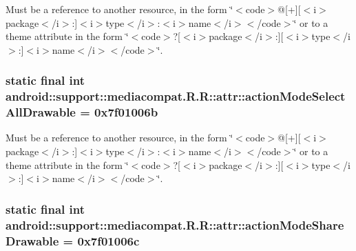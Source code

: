 Must be a reference to another resource, in the form \char`\"{}$<$code$>$@\mbox{[}+\mbox{]}\mbox{[}$<$i$>$package$<$/i$>$:\mbox{]}$<$i$>$type$<$/i$>$:$<$i$>$name$<$/i$>$$<$/code$>$\char`\"{} or to a theme attribute in the form \char`\"{}$<$code$>$?\mbox{[}$<$i$>$package$<$/i$>$:\mbox{]}\mbox{[}$<$i$>$type$<$/i$>$:\mbox{]}$<$i$>$name$<$/i$>$$<$/code$>$\char`\"{}. \hypertarget{classandroid_1_1support_1_1mediacompat_1_1_r_1_1attr_1cad0f0c7594e1af8e920d1537eef02a}{
\subsubsection[{actionModeSelectAllDrawable}]{\setlength{\rightskip}{0pt plus 5cm}static final int android::support::mediacompat.R.R::attr::actionModeSelectAllDrawable = 0x7f01006b}}
\label{classandroid_1_1support_1_1mediacompat_1_1_r_1_1attr_1cad0f0c7594e1af8e920d1537eef02a}


Must be a reference to another resource, in the form \char`\"{}$<$code$>$@\mbox{[}+\mbox{]}\mbox{[}$<$i$>$package$<$/i$>$:\mbox{]}$<$i$>$type$<$/i$>$:$<$i$>$name$<$/i$>$$<$/code$>$\char`\"{} or to a theme attribute in the form \char`\"{}$<$code$>$?\mbox{[}$<$i$>$package$<$/i$>$:\mbox{]}\mbox{[}$<$i$>$type$<$/i$>$:\mbox{]}$<$i$>$name$<$/i$>$$<$/code$>$\char`\"{}. \hypertarget{classandroid_1_1support_1_1mediacompat_1_1_r_1_1attr_b378adef847faa1e0e0426c8c8786c6d}{
\subsubsection[{actionModeShareDrawable}]{\setlength{\rightskip}{0pt plus 5cm}static final int android::support::mediacompat.R.R::attr::actionModeShareDrawable = 0x7f01006c}}
\label{classandroid_1_1support_1_1mediacompat_1_1_r_1_1attr_b378adef847faa1e0e0426c8c8786c6d}


